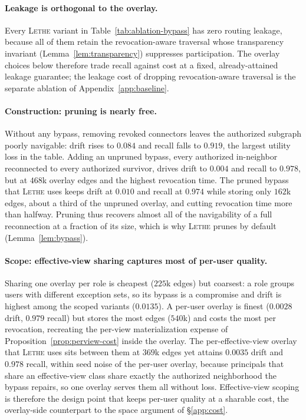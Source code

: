 \documentclass[sigconf, nonacm, review]{acmart}
\begin{document}
\paragraph{Leakage is orthogonal to the overlay.}
Every \textsc{Lethe} variant in Table~\ref{tab:ablation-bypass} has zero routing
leakage, because all of them retain the revocation-aware traversal whose
transparency invariant (Lemma~\ref{lem:transparency}) suppresses participation.
The overlay choices below therefore trade recall against cost at a fixed,
already-attained leakage guarantee; the leakage cost of dropping
revocation-aware traversal is the separate ablation of
Appendix~\ref{app:baseline}.

\paragraph{Construction: pruning is nearly free.}
Without any bypass, removing revoked connectors leaves the authorized subgraph
poorly navigable: drift rises to $0.084$ and recall falls to $0.919$, the
largest utility loss in the table. Adding an unpruned bypass, every
authorized in-neighbor reconnected to every authorized survivor, drives drift
to $0.004$ and recall to $0.978$, but at $468$k overlay edges and the highest
revocation time. The pruned bypass that \textsc{Lethe} uses keeps drift at
$0.010$ and recall at $0.974$ while storing only $162$k edges, about a third of
the unpruned overlay, and cutting revocation time more than halfway. Pruning thus
recovers almost all of the navigability of a full reconnection at a fraction of
its size, which is why \textsc{Lethe} prunes by default
(Lemma~\ref{lem:bypass}).

\paragraph{Scope: effective-view sharing captures most of per-user quality.}
Sharing one overlay per role is cheapest ($225$k edges) but coarsest: a role
groups users with different exception sets, so its bypass is a compromise and
drift is highest among the scoped variants ($0.0135$). A per-user overlay is
finest ($0.0028$ drift, $0.979$ recall) but stores the most edges ($540$k) and
costs the most per revocation, recreating the per-view materialization expense
of Proposition~\ref{prop:perview-cost} inside the overlay. The
per-effective-view overlay that \textsc{Lethe} uses sits between them at $369$k
edges yet attains $0.0035$ drift and $0.978$ recall, within seed noise of the
per-user overlay, because principals that share an effective-view class share
exactly the authorized neighborhood the bypass repairs, so one overlay serves
them all without loss. Effective-view scoping is therefore the design point that
keeps per-user quality at a sharable cost, the overlay-side counterpart to the
space argument of \S\ref{app:cost}.
\end{document}
